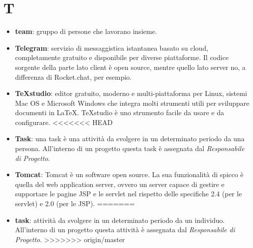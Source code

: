 \section{T}
\begin{itemize}
	\item \textbf{team}: gruppo di persone che lavorano insieme.
	\item \textbf{Telegram}: servizio di messaggistica istantanea basato su cloud, completamente gratuito e disponibile per diverse piattaforme. Il codice sorgente della parte lato client è open source, mentre quello lato server no, a differenza di Rocket.chat, per esempio.
	\item \textbf{TeXstudio}: editor gratuito, moderno e multi-piattaforma per Linux, sistemi Mac OS e Microsoft Windows che integra molti strumenti utili per sviluppare documenti in \LaTeX. TeXstudio è uno strumento facile da usare e da configurare.
<<<<<<< HEAD
	\item \textbf{Task}: una task è una attività da svolgere in un determinato periodo da una persona. All'interno di un progetto questa task è assegnata dal \textit{Responsabile di Progetto}.
	\item \textbf{Tomcat}: Tomcat è un software open source. La sua funzionalità di spicco è quella del web application server, ovvero un server capace di gestire e supportare le pagine JSP e le servlet nel rispetto delle specifiche 2.4 (per le servlet) e 2.0 (per le JSP).
=======
	\item \textbf{task}: attività da svolgere in un determinato periodo da un individuo. All'interno di un progetto questa attività è assegnata dal \textit{Responsabile di Progetto}.
>>>>>>> origin/master
\end{itemize}

